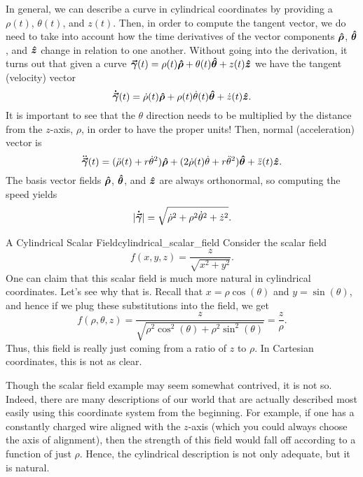 In general, we can describe a curve in cylindrical coordinates by providing a $\rho(t)$, $\theta(t)$, and $z(t)$. Then, in order to compute the tangent vector, we do need to take into account how the time derivatives of the vector components $\boldsymbol{\hat{\rho}}$, $\boldsymbol{\hat{\theta}}$, and $\boldsymbol{\hat{z}}$ change in relation to one another. Without going into the derivation, it turns out that given a curve $\boldsymbol{\vec{\gamma}}(t)=\rho(t) \boldsymbol{\hat{\rho}} + \theta(t)\boldsymbol{\hat{\theta}} + z(t) \boldsymbol{\hat{z}}$ we have the tangent (velocity) vector
\begin{equation}
	\boldsymbol{\dot{\vec{\gamma}}}(t)=\dot{\rho}(t) \boldsymbol{\hat{\rho}} + \rho(t)\dot{\theta}(t)\boldsymbol{\hat{\theta}} + \dot{z}(t) \boldsymbol{\hat{z}}.
\end{equation}
It is important to see that the $\theta$ direction needs to be multiplied by the distance from the $z$-axis, $\rho$, in order to have the proper units! Then, normal (acceleration) vector is
\begin{equation}
	\boldsymbol{\ddot{\vec{\gamma}}}(t)=(\ddot{\rho}(t) +r\dot{\theta}^2)\boldsymbol{\hat{\rho}} + (2\dot{\rho}(t)\dot{\theta} +r\ddot{\theta}^2)\boldsymbol{\hat{\theta}} + \ddot{z}(t) \boldsymbol{\hat{z}}.
\end{equation}
The basis vector fields $\boldsymbol{\hat{\rho}}$, $\boldsymbol{\hat{\theta}}$, and $\boldsymbol{\hat{z}}$ are always orthonormal, so computing the speed yields
\begin{equation}
	|\boldsymbol{\dot{\vec{\gamma}}}|=\sqrt{\dot{\rho}^2  + \rho^2 \dot{\theta}^2+ \dot{z}^2}. 
\end{equation}

\begin{ex}{A Cylindrical Scalar Field}{cylindrical_scalar_field}
    Consider the scalar field
    \[
    f(x,y,z) = \frac{z}{\sqrt{x^2+y^2}}.
    \]
    One can claim that this scalar field is much more natural in cylindrical coordinates.  Let's see why that is.  Recall that $x=\rho\cos(\theta)$ and $y=\sin(\theta)$, and hence if we plug these substitutions into the field, we get
    \[
    f(\rho,\theta,z) = \frac{z}{\sqrt{\rho^2 \cos^2(\theta) + \rho^2 \sin^2(\theta)}} = \frac{z}{\rho}.
    \]
    Thus, this field is really just coming from a ratio of $z$ to $\rho$.  In Cartesian coordinates, this is not as clear.
\end{ex}

Though the scalar field example may seem somewhat contrived, it is not so.  Indeed, there are many descriptions of our world that are actually described most easily using this coordinate system from the beginning.  For example, if one has a constantly charged wire aligned with the $z$-axis (which you could always choose the axis of alignment), then the strength of this field would fall off according to a function of just $\rho$.  Hence, the cylindrical description is not only adequate, but it is natural.

